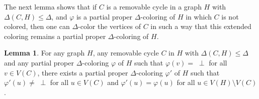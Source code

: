 \documentclass{article}
\theoremstyle{definition}
\newtheorem{lemma}{Lemma}[section]
\begin{document}
The next lemma shows that if $C$ is a removable cycle in a graph $H$ with $\Delta(C,H) \le \Delta$, and $\varphi$ is a partial proper $\Delta$-coloring of $H$ in which $C$ is not colored, then one can $\Delta$-color the vertices of $C$ in such a way that this extended coloring remains a partial proper $\Delta$-coloring of $H$.

\begin{lemma}\label{lem:coloringRemovableCycle} For any graph $H$, any removable cycle $C$ in $H$ with $\Delta(C,H) \le \Delta$ and any partial proper $\Delta$-coloring $\varphi$ of $H$ such that $\varphi(v) = \; \perp$ for all $v \in V(C)$, there exists a partial proper $\Delta$-coloring $\varphi'$ of $H$ such that $\varphi'(u) \neq \; \perp$ for all $u \in V(C)$ and $\varphi'(u) = \varphi(u)$ for all $u \in V(H) \setminus V(C)$.\end{lemma}
\end{document}
